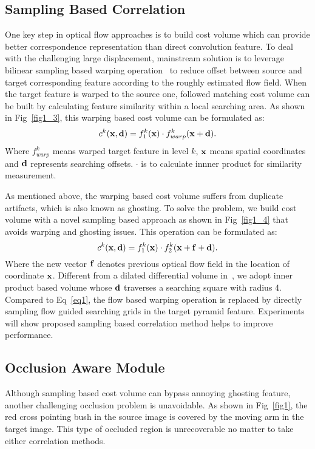 \documentclass{article}
\begin{document}
\subsection{Sampling Based Correlation}
One key step in optical flow approaches is to build cost volume which can provide better correspondence representation than direct convolution feature. To deal with the challenging large displacement, mainstream solution is to leverage bilinear sampling based warping operation~\cite{Ranjan_2017_CVPR,Sun_2018_CVPR,Hui_2018_CVPR,Hur_2019_IRR,Yin_2019_CVPR} to reduce offset between source and target corresponding feature according to the roughly estimated flow field. When the target feature is warped to the source one, followed matching cost volume can be built by calculating feature similarity within a local searching area. As shown in Fig~\ref{fig1_3}, this warping based cost volume can be formulated as:
\begin{equation}
c^k({\bf x}, {\bf d}) = {f_1^k({\bf x})} \cdot {f}_{warp}^k({\bf x}+{\bf d}).
\label{eq1}
\end{equation}
Where $f_{warp}^{k}$ means warped target feature in level $k$, $\bf x$ means spatial coordinates and $\bf d$ represents searching offsets. $\cdot$ is to calculate innner product for similarity measurement.

As mentioned above, the warping based cost volume suffers from duplicate artifacts, which is also known as ghosting. To solve the problem, we build cost volume with a novel sampling based approach as shown in Fig~\ref{fig1_4} that avoids warping and ghosting issues. This operation can be formulated as:
\begin{equation}
c^k({\bf x}, {\bf d}) = {f_1^k({\bf x})} \cdot {f}_2^k({\bf x}+{\bf f}+{\bf d}).
\label{eq2}
\end{equation}
Where the new vector $\bf f$ denotes previous optical flow field in the location of coordinate $\bf x$. Different from a dilated differential volume in~\cite{Lu_2020_WACV}, we adopt inner product based volume whose $\bf d$ traverses a searching square with radius 4. Compared to Eq~\ref{eq1}, the flow based warping operation is replaced by directly sampling flow guided searching grids in the target pyramid feature. Experiments will show proposed sampling based correlation method helps to improve performance.

\subsection{Occlusion Aware Module}
Although sampling based cost volume can bypass annoying ghosting feature, another challenging occlusion problem is unavoidable. As shown in Fig~\ref{fig1}, the red cross pointing bush in the source image is covered by the moving arm in the target image. This type of occluded region is unrecoverable no matter to take either correlation methods.
\end{document}
